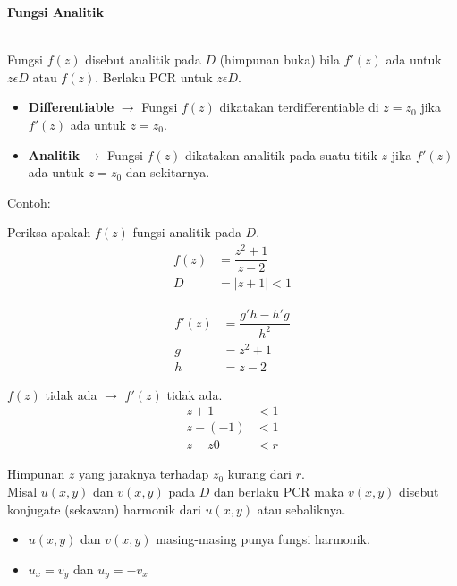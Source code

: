 \documentclass{article}
\begin{document}
    \newpage
    \begin{center}
        \textbf{Fungsi Analitik}
    \end{center}
    \leavevmode\\
    
    Fungsi $f(z)$ disebut analitik pada $D$ (himpunan buka) bila $f'(z)$ ada untuk $z \epsilon D$ atau $f(z)$. Berlaku PCR untuk $z \epsilon D$.
    \begin{itemize}
        \item \textbf{Differentiable} $\rightarrow$ Fungsi $f(z)$ dikatakan terdifferentiable di $z=z_0$ jika $f'(z)$ ada untuk $z=z_0$.
        \item \textbf{Analitik} $\rightarrow$ Fungsi $f(z)$ dikatakan analitik pada suatu titik $z$ jika $f'(z)$ ada untuk $z=z_0$ dan sekitarnya.
    \end{itemize}
    
    Contoh:
    
    Periksa apakah $f(z)$ fungsi analitik pada $D$.
    \begin{align}
        f(z)    &= \dfrac{z^2 + 1}{z - 2}
        \nonumber\\
        D       &= |z + 1| < 1
        \nonumber
    \end{align}

    \begin{align}
        f'(z)   &= \dfrac{g'h - h'g}{h^2}
            \nonumber\\
            g   &= z^2+1
            \nonumber\\
            h   &= z-2
            \nonumber
    \end{align}

    $f(z)$ tidak ada $\rightarrow$ $f'(z)$ tidak ada.
    \begin{align}
        z + 1     &< 1
        \nonumber\\
        z - (-1)  &< 1
        \nonumber\\
        z - z0    &< r
        \nonumber
    \end{align}

    Himpunan $z$ yang jaraknya terhadap $z_0$ kurang dari $r$.
    \\

    Misal  $u(x,y)$ dan  $v(x,y)$ pada $D$ dan berlaku PCR maka $v(x,y)$ disebut konjugate (sekawan) harmonik dari $u(x,y)$ atau sebaliknya. 
    \begin{itemize}
        \item $u(x,y)$ dan $v(x,y)$ masing-masing punya fungsi harmonik.
        \item $u_x = v_y$ dan $u_y = -v_x$
    \end{itemize}
\end{document}
